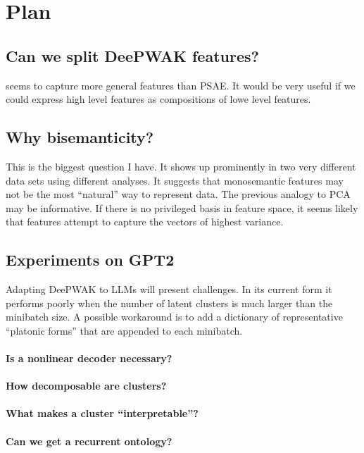\section{Plan}

\subsection{Can we split DeePWAK features?}
\DeePWAK seems to capture more general features than PSAE.
It would be very useful if we could express high level features as compositions of lowe level features.

\subsection{Why bisemanticity?}
This is the biggest question I have. It shows up prominently in two very different data sets using different analyses.
It suggests that monosemantic features may not be the most ``natural'' way to represent data.
The previous analogy to PCA may be informative.
If there is no privileged basis in feature space, it seems likely that features attempt to capture the vectors of highest variance.

\subsection{Experiments on GPT2}
Adapting DeePWAK to LLMs will present challenges.
In its current form it performs poorly when the number of latent clusters is much larger than the minibatch size.
A possible workaround is to add a dictionary of representative ``platonic forms'' that are appended to each minibatch.

\paragraph{Is a nonlinear decoder necessary?}

\paragraph{How decomposable are clusters?}

\paragraph{What makes a cluster ``interpretable''?}

\paragraph{Can we get a recurrent ontology?}
